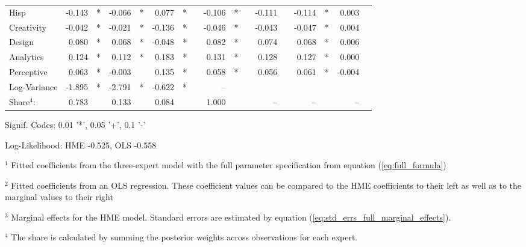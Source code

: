 \documentclass[12pt]{article}
\begin{document}
\begin{landscape}
\begin{table}
\begin{threeparttable}
\begin{tabular}[l]{l r l r l r l c r l c r l r l r l}
  Hisp                  & -0.143 & *      & -0.066 & *      &  0.077 & *      && -0.106 & *     && -0.111 &          & -0.114 & *        &  0.003 &        \\
  Creativity            & -0.042 & *      & -0.021 & *      & -0.136 & *      && -0.046 & *     && -0.043 &          & -0.047 & *        &  0.004 &        \\
  Design                &  0.080 & *      &  0.068 & *      & -0.048 & *      &&  0.082 & *     &&  0.074 &          &  0.068 & *        &  0.006 &        \\
  Analytics             &  0.124 & *      &  0.112 & *      &  0.183 & *      &&  0.131 & *     &&  0.128 &          &  0.127 & *        &  0.000 &        \\
  Perceptive            &  0.063 & *      & -0.003 &        &  0.135 & *      &&  0.058 & *     &&  0.056 &          &  0.061 & *        & -0.004 &        \\
  Log-Variance          & -1.895 & *      & -2.791 & *      & -0.622 & *      &&  --    &       &&  &          &  &          &  &        \\
  \cmidrule(l){2-3} \cmidrule(l){4-5} \cmidrule(l){6-7} \cmidrule(l){9-10} \cmidrule(l){12-13} \cmidrule(l){14-15} \cmidrule(l){16-17}
  Share$^{4}$:          & 0.783  &        & 0.133  &      & 0.084 &           &&  1.000 &       &&  --    &          &  --    &          &  --    &        \\
  \cmidrule{1-17}
        \end{tabular}
  
        \begin{tablenotes}
          \item Signif. Codes: 0.01 '*', 0.05 '+', 0.1 '-'
          \item Log-Likelihood: HME -0.525, OLS -0.558
          \item $^{1}$ Fitted coefficients from the three-expert model with the full parameter specification from equation (\ref{eq:full_formula})
          \item $^{2}$ Fitted coefficients from an OLS regression. These coefficient values can be compared to the HME coefficients to their left as well as to the marginal values to their right
          \item $^{3}$ Marginal effects for the HME model. Standard errors are estimated by equation (\ref{eq:std_errs_full_marginal_effects}).
          \item $^{4}$ The share is calculated by summing the posterior weights across observations for each expert.
  
        \end{tablenotes} \label{tbl:3D_full_regressions_results}
  
  
      \end{threeparttable}
  
  \end{table}
  \end{landscape}
\end{document}
